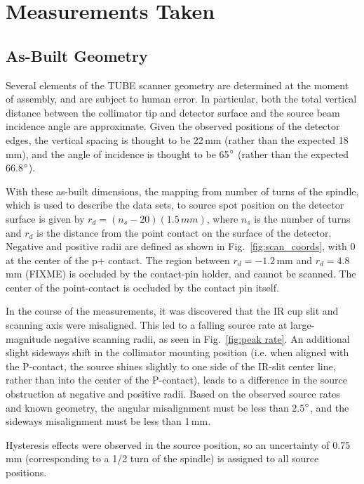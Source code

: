 \documentclass[groupedaddress,rmp,amsmath,amssymb,bibnotes,altaffilletter,twocolumn]{revtex4-1}
\begin{document}
\section{Measurements Taken} \label{sec:measurements}
\subsection{As-Built Geometry} \label{ssec:geometry}
Several elements of the TUBE scanner geometry are determined at the moment of assembly, and are subject to human error. In particular, both the total vertical distance between the collimator tip and detector surface and the source beam incidence angle are approximate. Given the observed positions of the detector edges, the vertical spacing is thought to be 22\,mm (rather than the expected 18\,mm), and the angle of incidence is thought to be 65$\degree$ (rather than the expected 66.8$\degree$). 

With these as-built dimensions, the mapping from number of turns of the spindle, which is used to describe the data sets, to source spot position on the detector surface is given by $r_d = (n_s-20)(1.5\,mm)$, where $n_s$ is the number of turns and $r_d$ is the distance from the point contact on the surface of the detector. Negative and positive radii are defined as shown in Fig.~\ref{fig:scan_coords}, with 0 at the center of the p+ contact. The region between $r_d = -1.2$\,mm and  $r_d = 4.8$\,mm (FIXME) is occluded by the contact-pin holder, and cannot be scanned. The center of the point-contact is occluded by the contact pin itself. 

In the course of the measurements, it was discovered that the IR cup slit and scanning axis were misaligned. This led to a falling source rate at large-magnitude negative scanning radii, as seen in Fig.~\ref{fig:peak rate}. An additional slight sideways shift in the collimator mounting position (i.e. when aligned with the P-contact, the source shines slightly to one side of the IR-slit center line, rather than into the center of the P-contact), leads to a difference in the source obstruction at negative and positive radii. Based on the observed source rates and known geometry, the angular misalignment must be less than 2.5$\degree$, and the sideways misalignment must be less than 1\,mm. 

Hysteresis effects were observed in the source position, so an uncertainty of 0.75\,mm (corresponding to a 1/2 turn of the spindle) is assigned to all source positions. 
\end{document}
